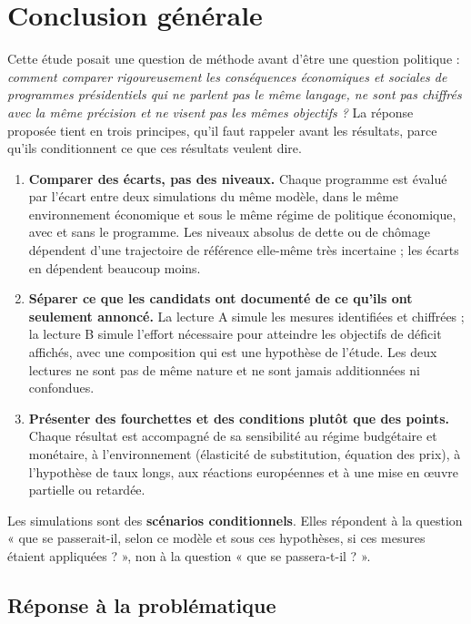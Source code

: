 \documentclass[
  11pt,
  11pt,
  a4paper,
  openany]{book}
\providecommand{\tightlist}{%
  \setlength{\itemsep}{0pt}\setlength{\parskip}{0pt}}
\begin{document}
\hypertarget{sec:conclusion}{%
\chapter{Conclusion générale}\label{sec:conclusion}}

Cette étude posait une question de méthode avant d'être une question
politique : \emph{comment comparer rigoureusement les conséquences
économiques et sociales de programmes présidentiels qui ne parlent pas
le même langage, ne sont pas chiffrés avec la même précision et ne
visent pas les mêmes objectifs ?} La réponse proposée tient en trois
principes, qu'il faut rappeler avant les résultats, parce qu'ils
conditionnent ce que ces résultats veulent dire.

\begin{enumerate}
\def\labelenumi{\arabic{enumi}.}
\tightlist
\item
  \textbf{Comparer des écarts, pas des niveaux.} Chaque programme est
  évalué par l'écart entre deux simulations du même modèle, dans le même
  environnement économique et sous le même régime de politique
  économique, avec et sans le programme. Les niveaux absolus de dette ou
  de chômage dépendent d'une trajectoire de référence elle-même très
  incertaine ; les écarts en dépendent beaucoup moins.
\item
  \textbf{Séparer ce que les candidats ont documenté de ce qu'ils ont
  seulement annoncé.} La lecture A simule les mesures identifiées et
  chiffrées ; la lecture B simule l'effort nécessaire pour atteindre les
  objectifs de déficit affichés, avec une composition qui est une
  hypothèse de l'étude. Les deux lectures ne sont pas de même nature et
  ne sont jamais additionnées ni confondues.
\item
  \textbf{Présenter des fourchettes et des conditions plutôt que des
  points.} Chaque résultat est accompagné de sa sensibilité au régime
  budgétaire et monétaire, à l'environnement (élasticité de
  substitution, équation des prix), à l'hypothèse de taux longs, aux
  réactions européennes et à une mise en œuvre partielle ou retardée.
\end{enumerate}

Les simulations sont des \textbf{scénarios conditionnels}. Elles
répondent à la question « que se passerait-il, selon ce modèle et sous
ces hypothèses, si ces mesures étaient appliquées ? », non à la question
« que se passera-t-il ? ».

\hypertarget{sec:reponse}{%
\section{Réponse à la problématique}\label{sec:reponse}}
\end{document}

